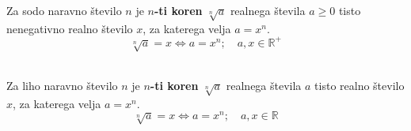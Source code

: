         

        


            

                
            

        


        

                Za sodo naravno število $n$ je \textbf{$n$-ti koren} $\sqrt[n]{a}$ realnega števila $a\geq 0$ tisto nenegativno realno število $x$,
                za katerega velja $a=x^n$.
                $$\displaystyle \sqrt[n]{a}=x \Leftrightarrow a=x^n; \quad a,x\in\mathbb{R}^+ $$
                ~
                
                Za liho naravno število $n$ je \textbf{$n$-ti koren} $\sqrt[n]{a}$ realnega števila $a$ tisto realno število $x$,
                za katerega velja $a=x^n$.
                $$\displaystyle \sqrt[n]{a}=x \Leftrightarrow a=x^n; \quad a,x\in\mathbb{R} $$
                ~
                
